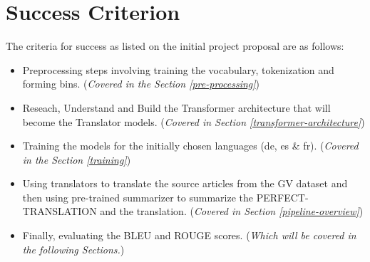 \documentclass[12pt,a4paper,twoside,openright]{report}
\begin{document}
\section{Success Criterion}
The criteria for success as listed on the initial project proposal are as follows: 
\begin{itemize}
    \item Preprocessing steps involving training the vocabulary, tokenization and forming bins. (\textit{Covered in the Section \ref{pre-processing}})
    \item Reseach, Understand and Build the Transformer architecture that will become the Translator models. (\textit{Covered in Section \ref{transformer-architecture}})
    \item Training the models for the initially chosen languages (de, es \& fr). (\textit{Covered in the Section \ref{training}})
    \item Using translators to translate the source articles from the GV dataset and then using pre-trained summarizer to summarize the PERFECT-TRANSLATION and the translation. (\textit{Covered in Section \ref{pipeline-overview}})
    \item Finally, evaluating the BLEU and ROUGE scores. (\textit{Which will be covered in the following Sections.})
\end{itemize}
\end{document}
